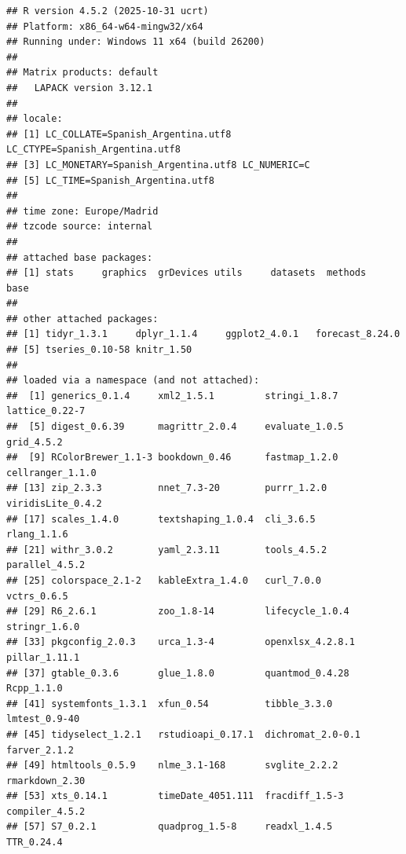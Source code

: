 \documentclass[
  12pt, a4paper, oneside]{article}
\begin{document}
\begin{verbatim}
## R version 4.5.2 (2025-10-31 ucrt)
## Platform: x86_64-w64-mingw32/x64
## Running under: Windows 11 x64 (build 26200)
## 
## Matrix products: default
##   LAPACK version 3.12.1
## 
## locale:
## [1] LC_COLLATE=Spanish_Argentina.utf8  LC_CTYPE=Spanish_Argentina.utf8   
## [3] LC_MONETARY=Spanish_Argentina.utf8 LC_NUMERIC=C                      
## [5] LC_TIME=Spanish_Argentina.utf8    
## 
## time zone: Europe/Madrid
## tzcode source: internal
## 
## attached base packages:
## [1] stats     graphics  grDevices utils     datasets  methods   base     
## 
## other attached packages:
## [1] tidyr_1.3.1     dplyr_1.1.4     ggplot2_4.0.1   forecast_8.24.0
## [5] tseries_0.10-58 knitr_1.50     
## 
## loaded via a namespace (and not attached):
##  [1] generics_0.1.4     xml2_1.5.1         stringi_1.8.7      lattice_0.22-7    
##  [5] digest_0.6.39      magrittr_2.0.4     evaluate_1.0.5     grid_4.5.2        
##  [9] RColorBrewer_1.1-3 bookdown_0.46      fastmap_1.2.0      cellranger_1.1.0  
## [13] zip_2.3.3          nnet_7.3-20        purrr_1.2.0        viridisLite_0.4.2 
## [17] scales_1.4.0       textshaping_1.0.4  cli_3.6.5          rlang_1.1.6       
## [21] withr_3.0.2        yaml_2.3.11        tools_4.5.2        parallel_4.5.2    
## [25] colorspace_2.1-2   kableExtra_1.4.0   curl_7.0.0         vctrs_0.6.5       
## [29] R6_2.6.1           zoo_1.8-14         lifecycle_1.0.4    stringr_1.6.0     
## [33] pkgconfig_2.0.3    urca_1.3-4         openxlsx_4.2.8.1   pillar_1.11.1     
## [37] gtable_0.3.6       glue_1.8.0         quantmod_0.4.28    Rcpp_1.1.0        
## [41] systemfonts_1.3.1  xfun_0.54          tibble_3.3.0       lmtest_0.9-40     
## [45] tidyselect_1.2.1   rstudioapi_0.17.1  dichromat_2.0-0.1  farver_2.1.2      
## [49] htmltools_0.5.9    nlme_3.1-168       svglite_2.2.2      rmarkdown_2.30    
## [53] xts_0.14.1         timeDate_4051.111  fracdiff_1.5-3     compiler_4.5.2    
## [57] S7_0.2.1           quadprog_1.5-8     readxl_1.4.5       TTR_0.24.4
\end{verbatim}
\end{document}
